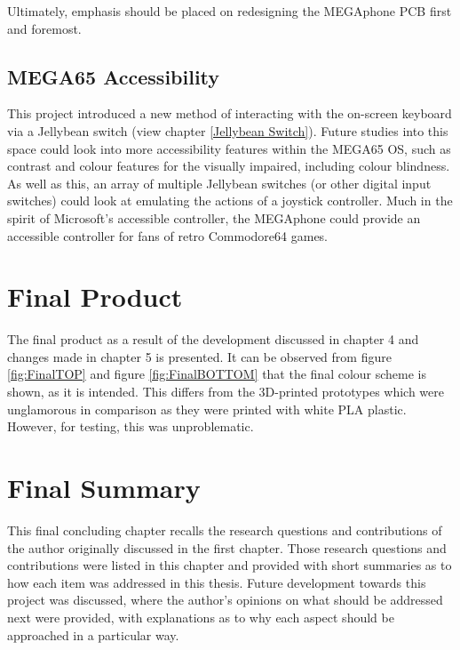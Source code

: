 Ultimately, emphasis should be placed on redesigning the MEGAphone PCB first and foremost.

\subsection{MEGA65 Accessibility}

This project introduced a new method of interacting with the on-screen keyboard via a Jellybean switch (view chapter \ref{Jellybean Switch}).
Future studies into this space could look into more accessibility features within the MEGA65 OS, such as contrast and colour features for the visually impaired, including colour blindness.
As well as this, an array of multiple Jellybean switches (or other digital input switches) could look at emulating the actions of a joystick controller.
Much in the spirit of Microsoft's accessible controller, the MEGAphone could provide an accessible controller for fans of retro Commodore64 games.


\section{Final Product}
The final product as a result of the development discussed in chapter 4 and changes made in chapter 5 is presented.
It can be observed from figure \ref{fig:FinalTOP} and figure \ref{fig:FinalBOTTOM} that the final colour scheme is shown, as it is intended.
This differs from the 3D-printed prototypes which were unglamorous in comparison as they were printed with white PLA plastic.
However, for testing, this was unproblematic.


\section{Final Summary}
This final concluding chapter recalls the research questions and contributions of the author originally discussed in the first chapter.
Those research questions and contributions were listed in this chapter and provided with short summaries as to how each item was addressed in this thesis.
Future development towards this project was discussed, where the author's opinions on what should be addressed next were provided, with explanations as to why each aspect should be approached in a particular way.

